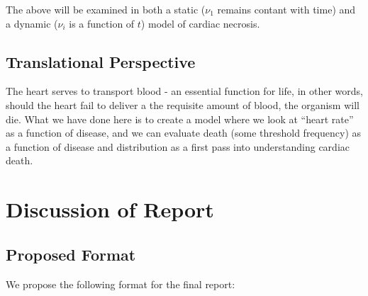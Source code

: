 \documentclass[11pt]{article}
\begin{document}
The above will be examined in both a static ($\nu_1$ remains contant with time) and a dynamic ($\nu_i$ is a function of $t$) model of cardiac necrosis. 

\subsection{Translational Perspective} %

The heart serves to transport blood - an essential function for life, in other words, should the heart fail to deliver a the requisite amount of blood, the organism will die. What we have done here is to create a model where we look at “heart rate” as a function of disease, and we can evaluate death (some threshold frequency) as a function of disease and distribution as a first pass into understanding cardiac death.

\section{Discussion of Report} %
\label{sec:discussion_of_report}

\subsection{Proposed Format} %
\label{sub:proposed_format}

We propose the following format for the final report:
\end{document}
